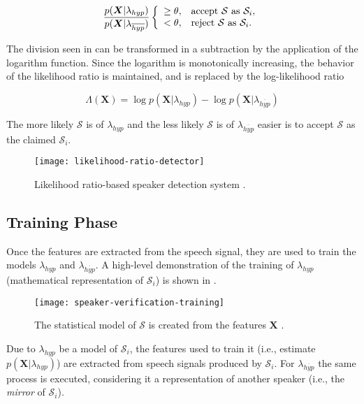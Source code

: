 \begin{equation}
    \frac{p(\boldsymbol{X}|\lambda_{hyp})}{p(\boldsymbol{X}|\lambda_{\overline{hyp}})} \verifytest{\theta}{\mathcal{S} \text{ as } \mathcal{S}_i}
    \label{eq:likelihood-ratio-test-3}
\end{equation}

The division seen in  can be transformed in a subtraction by the application of the logarithm function. Since the logarithm is monotonically increasing, the behavior of the likelihood ratio is maintained, and  is replaced by the log-likelihood ratio

\begin{equation}
    \Lambda(\boldsymbol{X}) = \log p(\boldsymbol{X}|\lambda_{hyp}) - \log p(\boldsymbol{X}|\lambda_{\overline{hyp}})
    \label{eq:log-likelihood-ratio}
\end{equation}

\noindent The more likely $\mathcal{S}$ is of $\lambda_{hyp}$ and the less likely $\mathcal{S}$ is of $\lambda_{\overline{hyp}}$ easier is to accept $\mathcal{S}$ as the claimed $\mathcal{S}_i$.

\begin{figure}[ht]
    \centering
    \texttt{[image: likelihood-ratio-detector]}
    \caption{Likelihood ratio-based speaker detection system \cite{bimbot.et.al.2004}.}
    \label{fig:likelihood-ratio-detector}
\end{figure}

\subsection{Training Phase}

Once the features are extracted from the speech signal, they are used to train the models $\lambda_{hyp}$ and $\lambda_{\overline{hyp}}$. A high-level demonstration of the training of $\lambda_{hyp}$ (mathematical representation of $\mathcal{S}_i$) is shown in .

\begin{figure}[ht]
    \centering
    \texttt{[image: speaker-verification-training]}
    \caption{The statistical model of $\mathcal{S}$ is created from the features $\boldsymbol{X}$ \cite{bimbot.et.al.2004}.}
    \label{fig:speaker-verification-training}
\end{figure}

\noindent Due to $\lambda_{hyp}$ be a model of $\mathcal{S}_i$, the features used to train it (i.e., estimate $p(\boldsymbol{X}|\lambda_{hyp})$) are extracted from speech signals produced by $\mathcal{S}_i$. For $\lambda_{\overline{hyp}}$ the same process is executed, considering it a representation of another speaker (i.e., the \emph{mirror} of $\mathcal{S}_i$).

